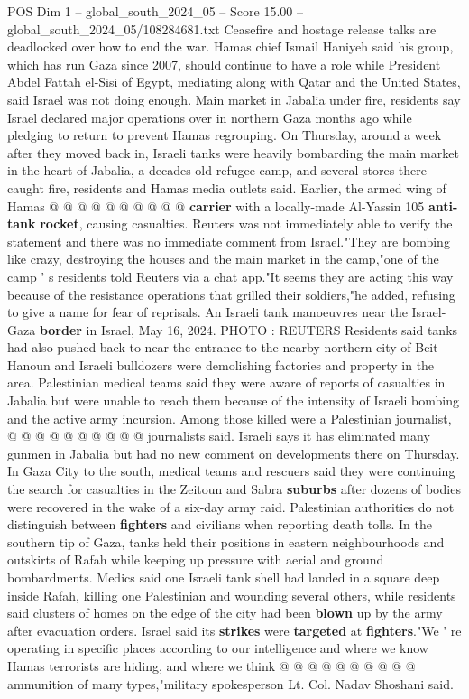 \begin{textsample}{POS Dim 1 – global\_south\_2024\_05 – Score 15.00 – global\_south\_2024\_05/108284681.txt}
Ceasefire and hostage release talks are deadlocked over how to end the war.
Hamas chief Ismail Haniyeh said his group, which has run Gaza since 2007, should continue to have a role while President Abdel Fattah el-Sisi of Egypt, mediating along with Qatar and the United States, said Israel was not doing enough.
Main market in Jabalia under fire, residents say Israel declared major operations over in northern Gaza months ago while pledging to return to prevent Hamas regrouping.
On Thursday, around a week after they moved back in, Israeli tanks were heavily bombarding the main market in the heart of Jabalia, a decades-old refugee camp, and several stores there caught fire, residents and Hamas media outlets said.
Earlier, the armed wing of Hamas @ @ @ @ @ @ @ @ @ @ \textbf{carrier} with a locally-made Al-Yassin 105 \textbf{anti-tank} \textbf{rocket}, causing casualties.
Reuters was not immediately able to verify the statement and there was no immediate comment from Israel."They are bombing like crazy, destroying the houses and the main market in the camp,"one of the camp ' s residents told Reuters via a chat app."It seems they are acting this way because of the resistance operations that grilled their soldiers,"he added, refusing to give a name for fear of reprisals.
An Israeli tank manoeuvres near the Israel-Gaza \textbf{border} in Israel, May 16, 2024.
PHOTO : REUTERS Residents said tanks had also pushed back to near the entrance to the nearby northern city of Beit Hanoun and Israeli bulldozers were demolishing factories and property in the area.
Palestinian medical teams said they were aware of reports of casualties in Jabalia but were unable to reach them because of the intensity of Israeli bombing and the active army incursion.
Among those killed were a Palestinian journalist, @ @ @ @ @ @ @ @ @ @ journalists said.
Israeli says it has eliminated many gunmen in Jabalia but had no new comment on developments there on Thursday.
In Gaza City to the south, medical teams and rescuers said they were continuing the search for casualties in the Zeitoun and Sabra \textbf{suburbs} after dozens of bodies were recovered in the wake of a six-day army raid.
Palestinian authorities do not distinguish between \textbf{fighters} and civilians when reporting death tolls.
In the southern tip of Gaza, tanks held their positions in eastern neighbourhoods and outskirts of Rafah while keeping up pressure with aerial and ground bombardments.
Medics said one Israeli tank shell had landed in a square deep inside Rafah, killing one Palestinian and wounding several others, while residents said clusters of homes on the edge of the city had been \textbf{blown} up by the army after evacuation orders.
Israel said its \textbf{strikes} were \textbf{targeted} at \textbf{fighters}."We ' re operating in specific places according to our intelligence and where we know Hamas terrorists are hiding, and where we think @ @ @ @ @ @ @ @ @ @ ammunition of many types,"military spokesperson Lt.
Col.
Nadav Shoshani said.

\end{textsample}
